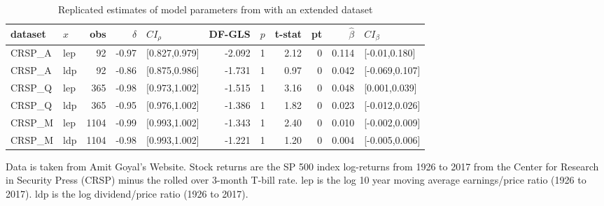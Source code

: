 \documentclass{article}
\begin{document}
\begin{table}[h!]
\small
\setlength\tabcolsep{5.3pt}
\centering
\caption{Replicated estimates of model parameters from \citet{campbell2006efficient} with an extended dataset}
\label{tab:extended}
\begin{threeparttable}
\begin{tabular}{llrrlrrrrrl}
  \hline
dataset & $x$ & obs & $\hat{\delta}$ & $CI_{\rho}$ & DF-GLS & $p$ &t-stat & pt & $\hat{\beta}$ & $CI_{\beta}$ \\ 
  \hline
    CRSP\_A  & lep & 92 & -0.97 & [0.827,0.979] & -2.092 & 1 & 2.12 & 0 & 0.114 & [-0.01,0.180] \\ 
    CRSP\_A  & ldp & 92 & -0.86 & [0.875,0.986] & -1.731 & 1 & 0.97 & 0 & 0.042 & [-0.069,0.107] \\ 
   CRSP\_Q & lep & 365 & -0.98 & [0.973,1.002] & -1.515 & 1 & 3.16 & 0 & 0.048 & [0.001,0.039] \\ 
  CRSP\_Q & ldp & 365 & -0.95 & [0.976,1.002] & -1.386 & 1 & 1.82 & 0 & 0.023 & [-0.012,0.026] \\ 
  CRSP\_M & lep & 1104 & -0.99 & [0.993,1.002] & -1.343 & 1 & 2.40 & 0 & 0.010 & [-0.002,0.009] \\ 
  CRSP\_M & ldp & 1104 & -0.98 & [0.993,1.002] & -1.221 & 1 & 1.20 & 0 & 0.004 & [-0.005,0.006] \\ 
\hline
\end{tabular}
 \begin{tablenotes}
 \small
\item Data is taken from Amit Goyal’s Website. Stock returns are the SP 500 index log-returns from 1926 to 2017 from the Center for Research in Security Press (CRSP) minus the rolled over 3-month T-bill rate. lep is the log 10 year moving average earnings/price ratio (1926 to 2017). ldp is the log dividend/price ratio (1926 to 2017).

\end{tablenotes}
\end{threeparttable}
\end{table}
\end{document}

